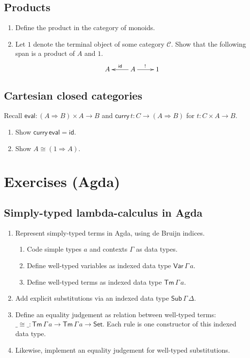 \documentclass[a4paper,fleqn]{scrartcl}
\newcommand{\wttm}{\ensuremath{\mathsf{Tm}\,\Gamma\,a}}
\newcommand{\tid}{\mathsf{id}}
\newcommand{\To}{\Rightarrow}
\newcommand{\too}{\longrightarrow}
\newcommand{\tcurry}{\mathsf{curry}}
\newcommand{\teval}{\mathsf{eval}}
\begin{document}
\subsection{Products}

\newcommand{\C}{\mathcal{C}}

\begin{enumerate}
\item Define the product in the category of monoids.
\item Let $1$ denote the terminal object of some category $\C$.
  Show that the following span is a product of $A$ and $1$.
\[
\xymatrix{
  A & A \ar[l]_{\tid} \ar[r]^{!} & 1
}
\]
\end{enumerate}

\subsection{Cartesian closed categories}

Recall $\teval : (A \To B) \times A \too B$ and
$\tcurry\, t : C \too (A \To B)$ for $t : C \times A \too B$.
\begin{enumerate}
\item Show $\tcurry\,\teval = \tid$.
\item Show $A \cong (1 \To A)$.
\end{enumerate}

\clearpage

\section{Exercises (Agda)}

\subsection{Simply-typed lambda-calculus in Agda}

\begin{enumerate}
\item Represent simply-typed terms in Agda, using de Bruijn indices.
  \begin{enumerate}
  \item Code simple types $a$ and contexts $\Gamma$ as data types.
  \item Define well-typed variables as indexed data type
    $\mathsf{Var}\,\Gamma\,a$.
  \item Define well-typed terms as indexed data type \wttm.
  \end{enumerate}
\item Add explicit substitutions via an indexed data type
  $\mathsf{Sub}\,\Gamma\,\Delta$.
\item Define an equality judgement as relation between well-typed
  terms: ${\_{\cong}\_} : \wttm \to \wttm \to \mathsf{Set}$.
  Each rule is one constructor of this indexed data type.
\item Likewise, implement an equality judgement for well-typed substitutions.
\end{enumerate}
\end{document}
